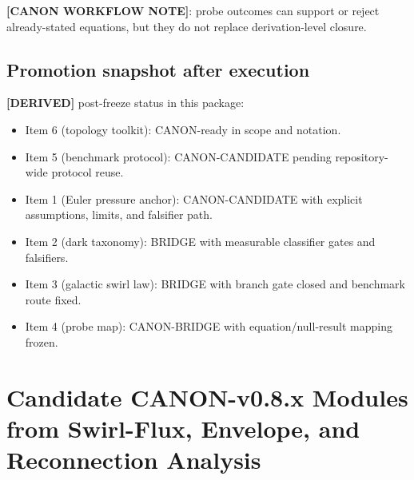 \textbf{[CANON WORKFLOW NOTE]}: probe outcomes can support or reject already-stated equations, but they do not replace derivation-level closure.

\subsection{Promotion snapshot after execution}
\textbf{[DERIVED]} post-freeze status in this package:
\begin{itemize}
    \item Item 6 (topology toolkit): CANON-ready in scope and notation.
    \item Item 5 (benchmark protocol): CANON-CANDIDATE pending repository-wide protocol reuse.
    \item Item 1 (Euler pressure anchor): CANON-CANDIDATE with explicit assumptions, limits, and falsifier path.
    \item Item 2 (dark taxonomy): BRIDGE with measurable classifier gates and falsifiers.
    \item Item 3 (galactic swirl law): BRIDGE with branch gate closed and benchmark route fixed.
    \item Item 4 (probe map): CANON-BRIDGE with equation/null-result mapping frozen.
\end{itemize}


\section{Candidate CANON-v0.8.x Modules from Swirl-Flux, Envelope, and Reconnection Analysis}
    \label{app:sst_v08_candidate_modules}

    \providecommand{\swirlarrow}{%
        \mathchoice{\mkern-2mu\scriptstyle\boldsymbol{\circlearrowleft}}%
        {\mkern-2mu\scriptstyle\boldsymbol{\circlearrowleft}}%
        {\mkern-2mu\scriptscriptstyle\boldsymbol{\circlearrowleft}}%
        {\mkern-2mu\scriptscriptstyle\boldsymbol{\circlearrowleft}}%
    }
    \providecommand{\vswirl}{\mathbf{v}_{\!\swirlarrow}}
\providecommand{\vchar}{v_{\!\boldsymbol{\circlearrowleft}}^{\ast}}
\providecommand{\uswirl}{\mathbf{u}_{\!\boldsymbol{\circlearrowleft}}}
\providecommand{\omegaswirl}{\boldsymbol{\omega}_{\!\boldsymbol{\circlearrowleft}}}
    \providecommand{\rhoF}{\rho_{\!f}}
    \providecommand{\rhoE}{\rho_{\!E}}
    \providecommand{\rhoM}{\rho_{\!m}}
    \providecommand{\rhocore}{\rho_{\mathrm{core}}}
    \providecommand{\rc}{r_c}
    \providecommand{\Fswirlmax}{F_{\mathrm{swirl}}^{\max}}
    
